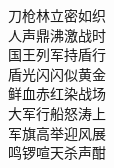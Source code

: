 \begin{translation*}{}
\begin{parcolumns}[nofirstindent=true]{3}
{            \hspace*{\fill}

            刀枪林立密如织\\
            人声鼎沸激战时\\
            国王列军持盾行\\
            盾光闪闪似黄金\\
            鲜血赤红染战场\\
            大军行船怒涛上\\
            军旗高举迎风展\\
            鸣锣喧天杀声酣\\
        }


        \colplacechunks
    \end{parcolumns}
\end{translation*}
